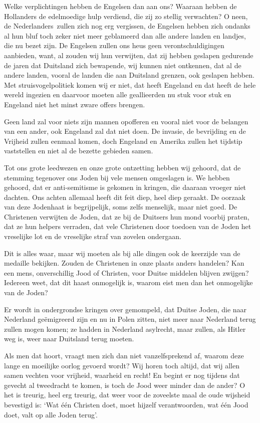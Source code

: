 \documentclass{book}
\begin{document}
Welke verplichtingen hebben de Engelsen dan aan ons? Waaraan hebben de
Hollanders de edelmoedige hulp verdiend, die zij zo stellig verwachten?
O neen, de Nederlanders~zullen zich nog erg vergissen, de Engelsen
hebben zich ondanks al hun bluf toch zeker niet meer geblameerd dan alle
andere landen en landjes, die nu bezet zijn. De Engelsen zullen ons heus
geen verontschuldigingen aanbieden, want, al zouden wij hun verwijten,
dat zij hebben geslapen gedurende de jaren dat Duitsland zich bewapende,
wij kunnen niet ontkennen, dat al de andere landen, vooral de landen die
aan Duitsland grenzen, ook geslapen hebben. Met struisvogelpolitiek
komen wij er niet, dat heeft Engeland en dat heeft de hele wereld
ingezien en daarvoor moeten alle geallieerden nu stuk voor stuk en
Engeland niet het minst zware offers brengen.

Geen land zal voor niets zijn mannen opofferen en vooral niet voor de
belangen van een ander, ook Engeland zal dat niet doen. De invasie, de
bevrijding en de Vrijheid zullen eenmaal komen, doch Engeland en Amerika
zullen het tijdstip vaststellen en niet al de bezette gebieden samen.

Tot ons grote leedwezen en onze grote ontzetting hebben wij gehoord, dat
de stemming tegenover ons Joden bij vele mensen omgeslagen is. We hebben
gehoord, dat er anti-semitisme is gekomen in kringen, die daaraan
vroeger niet dachten. Ons achten allemaal heeft dit feit diep, heel diep
geraakt. De oorzaak van deze Jodenhaat is begrijpelijk, soms zelfs
menselijk, maar niet goed. De Christenen verwijten de Joden, dat ze bij
de Duitsers hun mond voorbij praten, dat ze hun helpers verraden, dat
vele Christenen door toedoen van de Joden het vreselijke lot en de
vreselijke straf van zovelen ondergaan.

Dit is alles waar, maar wij moeten als bij alle dingen ook de keerzijde
van de medaille bekijken. Zouden de Christenen in onze plaats anders
handelen? Kan een mens, onverschillig Jood of Christen, voor Duitse
middelen blijven zwijgen? Iedereen weet, dat dit haast onmogelijk is,
waarom eist men dan het onmogelijke van de Joden?

Er wordt in ondergrondse kringen over gemompeld, dat Duitse Joden, die
naar Nederland geëmigreerd zijn en nu in Polen zitten, niet meer naar
Nederland terug zullen mogen komen; ze hadden in Nederland asylrecht,
maar zullen, als Hitler weg is, weer naar Duitsland terug moeten.

Als men dat hoort, vraagt men zich dan niet vanzelfsprekend af, waarom
deze lange en moeilijke oorlog gevoerd wordt? Wij horen toch altijd, dat
wij allen samen vechten voor vrijheid, waarheid en recht! En begint er
nog tijdens dat gevecht al tweedracht te komen, is toch de Jood weer
minder dan de ander? O het is treurig, heel erg treurig, dat weer voor
de zoveelste maal de oude wijsheid bevestigd is: `Wat één Christen doet,
moet hijzelf verantwoorden, wat één Jood doet, valt op alle Joden
terug'.
\end{document}
